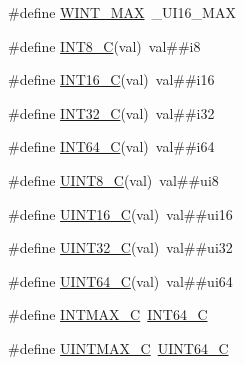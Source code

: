 \begin{DoxyCompactItemize}
\item 
\#define \hyperlink{a00119_ad3f7b6bb8aa7d619017a91d3b2edc1ee}{W\+I\+N\+T\+\_\+\+M\+AX}~\+\_\+\+U\+I16\+\_\+\+M\+AX
\item 
\#define \hyperlink{a00119_acf31df4f42272d793d752c4628c0f195}{I\+N\+T8\+\_\+C}(val)~val\#\#i8
\item 
\#define \hyperlink{a00119_ab8c7ef9b034497b6cbd51a82eb22943b}{I\+N\+T16\+\_\+C}(val)~val\#\#i16
\item 
\#define \hyperlink{a00119_a7df71d27f096826a76677178823f39bb}{I\+N\+T32\+\_\+C}(val)~val\#\#i32
\item 
\#define \hyperlink{a00119_a095799ae3fe39d90cfbbe21ad4713318}{I\+N\+T64\+\_\+C}(val)~val\#\#i64
\item 
\#define \hyperlink{a00119_a8caaafb4382e3c415f261b6580f0929d}{U\+I\+N\+T8\+\_\+C}(val)~val\#\#ui8
\item 
\#define \hyperlink{a00119_ac8ab4bd1a0343acea9b7ed3e05c5ad13}{U\+I\+N\+T16\+\_\+C}(val)~val\#\#ui16
\item 
\#define \hyperlink{a00119_a189f825ef34a1be844d384db2618ce12}{U\+I\+N\+T32\+\_\+C}(val)~val\#\#ui32
\item 
\#define \hyperlink{a00119_a8da5373e041921aa34c2b6172ac3babc}{U\+I\+N\+T64\+\_\+C}(val)~val\#\#ui64
\item 
\#define \hyperlink{a00119_ad558c804c227da1f8e1844e5314e80c5}{I\+N\+T\+M\+A\+X\+\_\+C}~\hyperlink{a00119_a095799ae3fe39d90cfbbe21ad4713318}{I\+N\+T64\+\_\+C}
\item 
\#define \hyperlink{a00119_ad7d1c8e3d3b8ba6eed942f6f7a0910db}{U\+I\+N\+T\+M\+A\+X\+\_\+C}~\hyperlink{a00119_a8da5373e041921aa34c2b6172ac3babc}{U\+I\+N\+T64\+\_\+C}
\end{DoxyCompactItemize}
